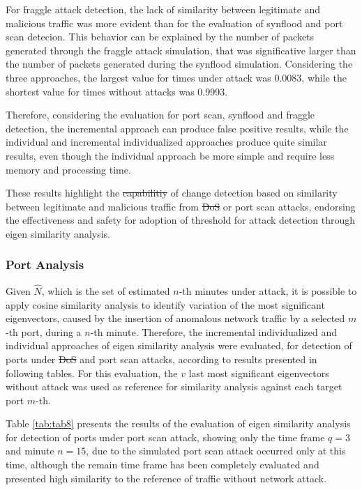 \documentclass[review]{elsarticle}
\providecommand{\DIFaddtex}[1]{{\protect\color{blue}\uwave{#1}}} %
\providecommand{\DIFdeltex}[1]{{\protect\color{red}\sout{#1}}}                      %
\providecommand{\DIFaddbegin}{} %
\providecommand{\DIFaddend}{} %
\providecommand{\DIFdelbegin}{} %
\providecommand{\DIFdelend}{} %
\providecommand{\DIFadd}[1]{\texorpdfstring{\DIFaddtex{#1}}{#1}} %
\providecommand{\DIFdel}[1]{\texorpdfstring{\DIFdeltex{#1}}{}} %
\begin{document}
For fraggle attack detection, the lack of similarity between legitimate and malicious traffic was more evident than for the evaluation of synflood and port scan detecion. This behavior can be explained by the number of packets generated through the fraggle attack simulation, that was significative larger than the number of packets generated during the synflood simulation. Considering the three approaches, the largest value for times under attack was 0.0083, while the shortest value for times without attacks was 0.9993. 

Therefore, considering the evaluation for port scan, synflood and fraggle detection, the incremental approach can produce false positive results, while the individual and incremental individualized approaches produce quite similar results, even though the individual approach be more simple and require less memory and processing time.

These results highlight the \DIFdelbegin \DIFdel{capabilitiy }\DIFdelend \DIFaddbegin \DIFadd{capability }\DIFaddend of change detection based on similarity between legitimate and malicious traffic from \DIFdelbegin \DIFdel{DoS }\DIFdelend \DIFaddbegin \DIFadd{flood }\DIFaddend or port scan attacks, endorsing the effectiveness and safety for adoption of threshold for attack detection through eigen similarity analysis.

\subsubsection{Port Analysis}
\label{sec:PortAnalysis}

Given $\hat{N}$, which is the set of estimated $n$-th minutes under attack, it is possible to apply cosine similarity analysis to identify variation of the most significant eigenvectors, caused by the insertion of anomalous network traffic by a selected $m$-th port, during a $n$-th minute. Therefore, the incremental individualized and individual approaches of eigen similarity analysis were evaluated, for detection of ports under \DIFdelbegin \DIFdel{DoS }\DIFdelend \DIFaddbegin \DIFadd{flood }\DIFaddend and port scan attacks, according to results presented in following tables. For this evaluation, the $v$ last most significant eigenvectors without attack was used as reference for similarity analysis against each target port $m$-th.

Table \ref{tab:tab8} presents the results of the evaluation of eigen similarity analysis for detection of ports under port scan attack, showing only the time frame $q=3$ and minute $n=15$, due to the simulated port scan attack occurred only at this time, although the remain time frame has been completely evaluated and presented high similarity to the reference of traffic without network attack.
\end{document}
